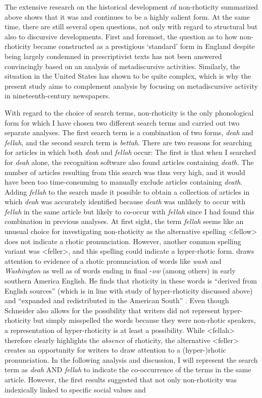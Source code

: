 The extensive research on the historical development of non-rhoticity summarized above shows that it was and continues to be a highly salient form. At the same time, there are still several open questions, not only with regard to structural but also to discursive developments. First and foremost, the question as to how non-rhoticity became constructed as a prestigious ‘standard’ form in England despite being largely condemned in prescriptivist texts has not been answered convincingly based on an analysis of metadiscursive activities. Similarly, the situation in the United States has shown to be quite complex, which is why the present study aims to complement  analysis by focusing on metadiscursive activity in nineteenth-century newspapers.

With regard to the choice of search terms, non-rhoticity is the only phonological form for which I have chosen two different search terms and carried out two separate analyses. The first search term is a combination of two forms, \emph{deah} and \emph{fellah}, and the second search term is \emph{bettah}. There are two reasons for searching for articles in which both \emph{deah} and \emph{fellah} occur: The first is that when I searched for \emph{deah} alone, the recognition software also found articles containing \emph{death}. The number of articles resulting from this search was thus very high, and it would have been too time-consuming to manually exclude articles containing \emph{death}. Adding \emph{fellah} to the search made it possible to obtain a collection of articles in which \emph{deah} was accurately identified because \emph{death} was unlikely to occur with \emph{fellah} in the same article but likely to co-occur with \emph{fellah} since I had found this combination in previous analyses. At first sight, the term \emph{fellah} seems like an unusual choice for investigating non-rhoticity as the alternative spelling <fellow> does not indicate a rhotic pronunciation. However, another common spelling variant was <feller>, and this spelling could indicate a hyper-rhotic form. \citet[279--280]{Schneider2004} draws attention to evidence of a rhotic pronunciation of words like \emph{wash} and \emph{Washington} as well as of words ending in final -\emph{ow} (among others) in early southern America English. He finds that rhoticity in these words is “derived from English sources” (which is in line with  study of hyper-rhoticity discussed above) and “expanded and redistributed in the American South” \citep[280]{Schneider2004}. Even though Schneider also allows for the possibility that writers did not represent hyper-rhoticity but simply misspelled the words because they were non-rhotic speakers, a representation of hyper-rhoticity is at least a possibility. While <fellah> therefore clearly highlights the \emph{absence} of rhoticity, the alternative <feller> creates an opportunity for writers to draw attention to a (hyper-)rhotic pronunciation. In the following analysis and discussion, I will represent the search term as \emph{deah} AND \emph{fellah} to indicate the co-occurrence of the terms in the same article. However, the first results suggested that not only non-rhoticity was indexically linked to specific social values and 